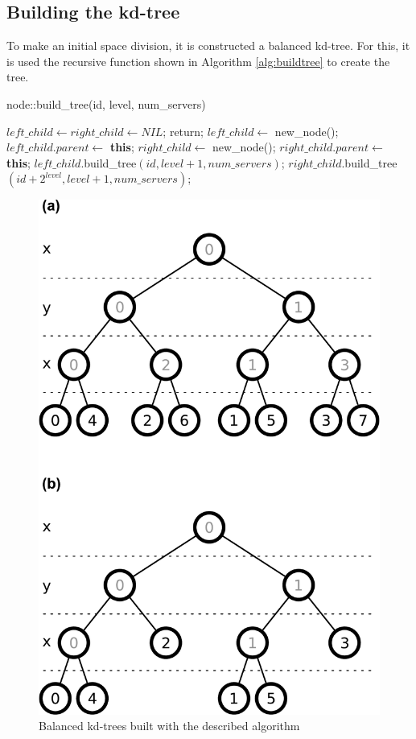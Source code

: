 \subsection{Building the kd-tree}

To make an initial space division, it is constructed a balanced kd-tree. For this, it is used the recursive function shown in Algorithm \ref{alg:buildtree} to create the tree.

\begin{algorithm}
\caption{node::build\_tree(id, level, num\_servers)}
\label{alg:buildtree}
\begin{algorithmic}
		\STATE $left\_child \leftarrow right\_child \leftarrow NIL$;
		\STATE return;
	\ELSE
		\STATE $left\_child \leftarrow$ new\_node();
		\STATE $left\_child.parent \leftarrow$ \textbf{this};
		\STATE $right\_child \leftarrow$ new\_node();
		\STATE $right\_child.parent \leftarrow$ \textbf{this};
		\STATE $left\_child$.build\_tree$(id, level + 1, num\_servers)$;
		\STATE $right\_child$.build\_tree$(id + 2^{level}, level + 1, num\_servers)$;
	\ENDIF
\end{algorithmic}
\end{algorithm}

\begin{figure}[!t]
	\centering
	\includegraphics[width=0.75\linewidth]{images/kdtree}
	\caption{Balanced kd-trees built with the described algorithm}
	\label{fig:kdtree}
\end{figure}

